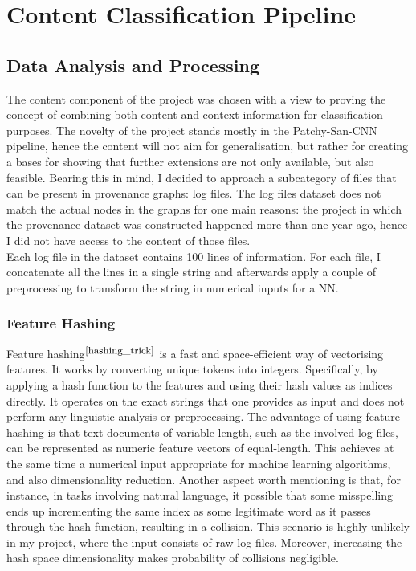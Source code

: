 \section{Content Classification Pipeline}
\subsection{Data Analysis and Processing}

The content component of the project was chosen with a view to proving the concept of combining both content and context information for classification purposes. The novelty of the project stands mostly in the Patchy-San-CNN pipeline, hence the content will not aim for generalisation, but rather for creating a bases for showing that further extensions are not only available, but also feasible. Bearing this in mind, I decided to approach a subcategory of files that can be present in provenance graphs: log files. The log files dataset does not match the actual nodes in the graphs for one main reasons: the project in which the provenance dataset was constructed happened more than one year ago, hence I did not have access to the content of those files. \\

Each log file in the dataset contains 100 lines of information. For each file, I concatenate all the lines in a single string and afterwards apply a couple of preprocessing to transform the string in numerical inputs for a NN. \\

\subsubsection*{Feature Hashing}

Feature hashing$^{\small \cite{hashing_trick}}$ is a fast and space-efficient way of vectorising features. It works by converting unique tokens into integers. Specifically, by applying a hash function to the features and using their hash values as indices directly. It operates on the exact strings that one provides as input and does not perform any linguistic analysis or preprocessing. The advantage of using feature hashing is that text documents of variable-length, such as the involved log files, can be represented as numeric feature vectors of equal-length. This achieves at the same time a numerical input appropriate for machine learning algorithms, and also dimensionality reduction. Another aspect worth mentioning is that, for instance, in tasks involving natural language, it possible that some misspelling ends up incrementing the same index as some legitimate word as it passes through the hash function, resulting in a collision. This scenario is highly unlikely in my project, where the input consists of raw log files. Moreover, increasing the hash space dimensionality makes probability of collisions negligible.\\

